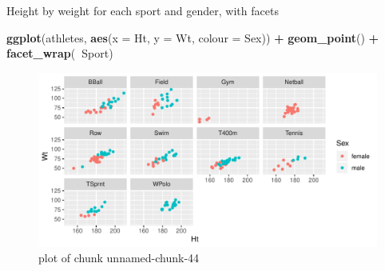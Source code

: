 \documentclass[ignorenonframetext,]{beamer}
\newenvironment{Shaded}{\begin{snugshade}}{\end{snugshade}}
\newcommand{\DataTypeTok}[1]{\textcolor[rgb]{0.13,0.29,0.53}{#1}}
\newcommand{\KeywordTok}[1]{\textcolor[rgb]{0.13,0.29,0.53}{\textbf{#1}}}
\newcommand{\NormalTok}[1]{#1}
\newcommand{\OperatorTok}[1]{\textcolor[rgb]{0.81,0.36,0.00}{\textbf{#1}}}
\newcommand{\StringTok}[1]{\textcolor[rgb]{0.31,0.60,0.02}{#1}}
\begin{document}
\begin{frame}[fragile]{Height by weight for each sport and gender, with
facets}
\protect\hypertarget{height-by-weight-for-each-sport-and-gender-with-facets}{}

\begin{Shaded}
\begin{Highlighting}[]
\KeywordTok{ggplot}\NormalTok{(athletes, }\KeywordTok{aes}\NormalTok{(}\DataTypeTok{x =}\NormalTok{ Ht, }\DataTypeTok{y =}\NormalTok{ Wt, }\DataTypeTok{colour =}\NormalTok{ Sex)) }\OperatorTok{+}
\StringTok{  }\KeywordTok{geom_point}\NormalTok{() }\OperatorTok{+}\StringTok{ }\KeywordTok{facet_wrap}\NormalTok{(}\OperatorTok{~}\NormalTok{Sport)}
\end{Highlighting}
\end{Shaded}

\begin{figure}
\centering
\includegraphics{figure/unnamed-chunk-44-1.pdf}
\caption{plot of chunk unnamed-chunk-44}
\end{figure}

\end{frame}
\end{document}
